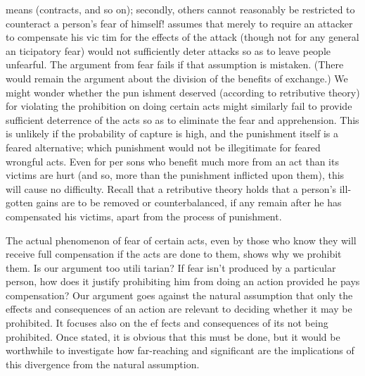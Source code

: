 \documentclass[11pt,openany]{book}
\begin{document}
means (contracts, and so on); secondly, others cannot reasonably be restricted to counteract a person's fear of himself! assumes that merely to require an attacker to compensate his vic tim for the effects of the attack (though not for any general an ticipatory fear) would not sufficiently deter attacks so as to leave people unfearful. The argument from fear fails if that assumption is mistaken. (There would remain the argument about the division of the benefits of exchange.) We might wonder whether the pun ishment deserved (according to retributive theory) for violating the prohibition on doing certain acts might similarly fail to provide sufficient deterrence of the acts so as to eliminate the fear and apprehension. This is unlikely if the probability of capture is high, and the punishment itself is a feared alternative; which punishment would not be illegitimate for feared wrongful acts. Even for per sons who benefit much more from an act than its victims are hurt (and so, more than the punishment inflicted upon them), this will cause no difficulty. Recall that a retributive theory holds that a person's ill-gotten gains are to be removed or counterbalanced, if any remain after he has compensated his victims, apart from the process of punishment. 

The actual phenomenon of fear of certain acts, even by those who know they will receive full compensation if the acts are done to them, shows why we prohibit them. Is our argument too utili tarian? If fear isn't produced by a particular person, how does it justify prohibiting him from doing an action provided he pays compensation? Our argument goes against the natural assumption that only the effects and consequences of an action are relevant to deciding whether it may be prohibited. It focuses also on the ef fects and consequences of its not being prohibited. Once stated, it is obvious that this must be done, but it would be worthwhile to investigate how far-reaching and significant are the implications of this divergence from the natural assumption. 
\end{document}
